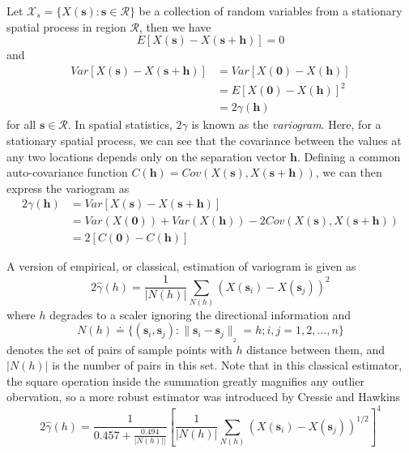 \documentclass[12pt]{article}
\numberwithin{equation}{section}
\numberwithin{table}{section}
\numberwithin{figure}{section}
\newcommand{\norm}[2]{\|{#1}\|_{{}_{#2}}}
\newcommand{\bms}{\bm{s}}
\newcommand{\bmh}{\bm{h}}
\begin{document}
Let $\mathcal{X}_s = \{ X(\bms) : \bms \in \mathcal{R} \}$ be a
collection of random variables from a stationary spatial process in
region $\mathcal{R}$, then we have
\begin{equation} \label{ssmean}
  E[X(\bms) - X(\bms + \bmh)] = 0
\end{equation}
and
\begin{equation} \label{ssvar}
\begin{split}
  Var[X(\bms) - X(\bms + \bmh)] &= Var[X(\bm{0}) - X(\bmh)] \\
  &= E[X(\bm{0}) - X(\bmh)]^2 \\
  &= 2\gamma(\bmh)
\end{split}
\end{equation}
for all $\bms \in \mathcal{R}$. In spatial statistics, $2\gamma$ is
known as the \emph{variogram}. Here, for a stationary spatial process,
we can see that the covariance between the values at any two locations 
depends only on the separation vector $\bmh$. Defining a common
auto-covariance function $C(\bmh) = Cov(X(\bms), X(\bms +
\bmh))$, we can then express the variogram as
\begin{equation} \label{variodef}
\begin{split}
  2\gamma(\bmh) &= Var[X(\bms) - X(\bms + \bmh)] \\
  &= Var(X(\bm{0})) + Var(X(\bmh)) - 2Cov(X(\bms), X(\bms + \bmh)) \\
  &= 2[C(\bm{0}) - C(\bmh)]
\end{split}
\end{equation}


A version of empirical, or classical, estimation of variogram is given as
\begin{equation} \label{varioest0}
  2\hat{\gamma}(h) = \frac{1}{|N(h)|} \sum_{N(h)} \left( X(\bms_i)
  - X(\bms_j) \right)^2 
\end{equation}
where $h$ degrades to a scaler ignoring the directional information and 
\begin{equation} \label{Nhdef}
  N(h) \doteq \{ (\bms_i, \bms_j) : \norm{\bms_i - \bms_j}{2} = h; i,j = 1,2,...,n \}
\end{equation}
denotes the set of pairs of sample points with $h$ distance between
them, and $|N(h)|$ is the number of pairs in this set. Note that in
this classical estimator, the square operation inside the summation
greatly magnifies any outlier obervation, so a more robust estimator
was introduced by Cressie and Hawkins\cite{Cressie93}
\begin{equation} \label{varioest1}
  2\hat{\gamma}(h) = \frac{1}{0.457+\frac{0.494}{|N(h)||}}\left[\frac{1}{|N(h)|}
  \sum_{N(h)} (X(\bms_i) - X(\bms_j))^{1/2}\right]^4
\end{equation}
\end{document}
